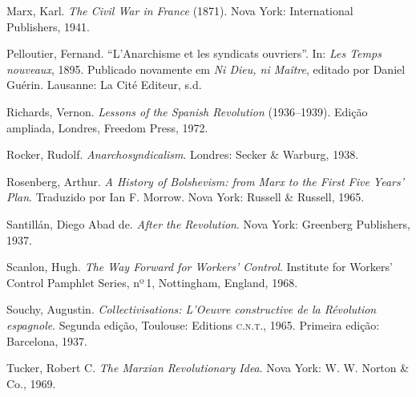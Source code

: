 {Marx}, Karl. \textit{The Civil War in France} (1871). Nova York:
International Publishers, 1941.

{Pelloutier}, Fernand. “L’Anarchisme et les syndicats ouvriers”.
In: \textit{Les Temps nouveaux}, 1895. Publicado novamente em \textit{Ni
Dieu, ni Maître}, editado por Daniel Guérin. Lausanne: La Cité
Editeur, s.d.

{Richards}, Vernon. \textit{Lessons of the Spanish Revolution}
(1936--1939). Edição ampliada, Londres, Freedom Press, 1972.

{Rocker}, Rudolf. \textit{Anarchosyndicalism}. Londres: Secker \&
Warburg, 1938.

{Rosenberg}, Arthur. \textit{A History of Bolshevism: from Marx to the
First Five Years’ Plan}. Traduzido por Ian F. Morrow. Nova York:
Russell \& Russell, 1965.

{Santillán}, Diego Abad de. \textit{After the Revolution}. Nova York:
Greenberg Publishers, 1937.

{Scanlon}, Hugh. \textit{The Way Forward for Workers’ Control}.
Institute for Workers’ Control Pamphlet Series, nº\,1, Nottingham, England, 1968.

{Souchy}, Augustin. \textit{Collectivisations: L’Oeuvre constructive de la Révolution
espagnole}. Segunda edição, Toulouse: Editions \textsc{c.n.t.}, 1965. Primeira
edição: Barcelona, 1937.

{Tucker}, Robert C. \textit{The Marxian Revolutionary Idea}. Nova York:
W. W. Norton \& Co., 1969.
